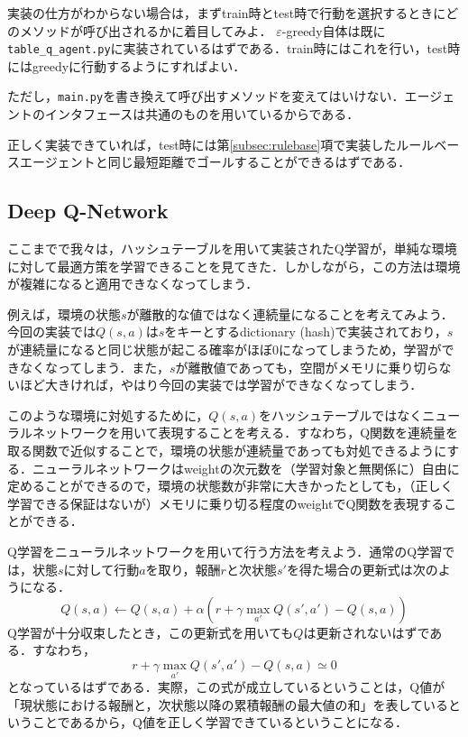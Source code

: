   実装の仕方がわからない場合は，まずtrain時とtest時で行動を選択するときにどのメソッドが呼び出されるかに着目してみよ．
  $\varepsilon$-greedy自体は既に\verb+table_q_agent.py+に実装されているはずである．train時にはこれを行い，test時にはgreedyに行動するようにすればよい．

  ただし，\verb+main.py+を書き換えて呼び出すメソッドを変えてはいけない．エージェントのインタフェースは共通のものを用いているからである．

  正しく実装できていれば，test時には第\ref{subsec:rulebase}項で実装したルールベースエージェントと同じ最短距離でゴールすることができるはずである．

  \subsection{Deep Q-Network}
  ここまでで我々は，ハッシュテーブルを用いて実装されたQ学習が，単純な環境に対して最適方策を学習できることを見てきた．しかしながら，この方法は環境が複雑になると適用できなくなってしまう．

  例えば，環境の状態$s$が離散的な値ではなく連続量になることを考えてみよう．今回の実装では$Q(s, a)$は$s$をキーとするdictionary (hash)で実装されており，$s$が連続量になると同じ状態が起こる確率がほぼ0になってしまうため，学習ができなくなってしまう．また，$s$が離散値であっても，空間がメモリに乗り切らないほど大きければ，やはり今回の実装では学習ができなくなってしまう．

  このような環境に対処するために，$Q(s, a)$をハッシュテーブルではなくニューラルネットワークを用いて表現することを考える．すなわち，Q関数を連続量を取る関数で近似することで，環境の状態が連続量であっても対処できるようにする．ニューラルネットワークはweightの次元数を（学習対象と無関係に）自由に定めることができるので，環境の状態数が非常に大きかったとしても，（正しく学習できる保証はないが）メモリに乗り切る程度のweightでQ関数を表現することができる．

  Q学習をニューラルネットワークを用いて行う方法を考えよう．通常のQ学習では，状態$s$に対して行動$a$を取り，報酬$r$と次状態$s'$を得た場合の更新式は次のようになる．
  \begin{equation}
   Q(s, a) \leftarrow Q(s, a) + \alpha \left( r + \gamma \max_{a'} Q(s', a') - Q(s, a)\right)
  \end{equation}
  Q学習が十分収束したとき，この更新式を用いても$Q$は更新されないはずである．すなわち，
  \begin{equation}
    r + \gamma \max_{a'} Q(s', a') - Q(s, a) \simeq 0
  \end{equation}
  となっているはずである．実際，この式が成立しているということは，Q値が「現状態における報酬と，次状態以降の累積報酬の最大値の和」を表しているということであるから，Q値を正しく学習できているということになる．

